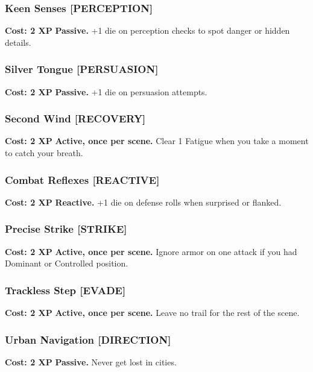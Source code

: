 \subsubsection*{Keen Senses \textnormal{[PERCEPTION]}}
\label{talent:keen-senses}
\textbf{Cost: 2 XP} \textbf{Passive.} +1 die on perception checks to spot danger or hidden details.

\subsubsection*{Silver Tongue \textnormal{[PERSUASION]}}
\label{talent:silver-tongue}
\textbf{Cost: 2 XP} \textbf{Passive.} +1 die on persuasion attempts.

\subsubsection*{Second Wind \textnormal{[RECOVERY]}}
\label{talent:second-wind}
\textbf{Cost: 2 XP} \textbf{Active, once per scene.} Clear 1 Fatigue when you take a moment to catch your breath.

\subsubsection*{Combat Reflexes \textnormal{[REACTIVE]}}
\label{talent:combat-reflexes}
\textbf{Cost: 2 XP} \textbf{Reactive.} +1 die on defense rolls when surprised or flanked.

\subsubsection*{Precise Strike \textnormal{[STRIKE]}}
\label{talent:precise-strike}
\textbf{Cost: 2 XP} \textbf{Active, once per scene.} Ignore armor on one attack if you had Dominant or Controlled position.

\subsubsection*{Trackless Step \textnormal{[EVADE]}}
\label{talent:trackless-step}
\textbf{Cost: 2 XP} \textbf{Active, once per scene.} Leave no trail for the rest of the scene.

\subsubsection*{Urban Navigation \textnormal{[DIRECTION]}}
\label{talent:urban-navigation}
\textbf{Cost: 2 XP} \textbf{Passive.} Never get lost in cities.

